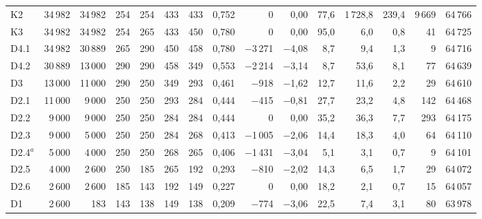\begin{longtable}{lrrrrrrrrrrrrrr}
K2 & 34\,982 & 34\,982 & 254 & 254 & 433 & 433 & 0,752 & 0 & 0,00 & 77,6 & 1\,728,8 & 239,4 & 9\,669 & 64\,766\\
K3 & 34\,982 & 34\,982 & 254 & 265 & 433 & 450 & 0,780 & 0 & 0,00 & 95,0 & 6,0 & 0,8 & 41 & 64\,725\\
D4.1 & 34\,982 & 30\,889 & 265 & 290 & 450 & 458 & 0,780 & $-$3\,271 & $-$4,08 & 8,7 & 9,4 & 1,3 & 9 & 64\,716\\
D4.2 & 30\,889 & 13\,000 & 290 & 290 & 458 & 349 & 0,553 & $-$2\,214 & $-$3,14 & 8,7 & 53,6 & 8,1 & 77 & 64\,639\\
D3 & 13\,000 & 11\,000 & 290 & 250 & 349 & 293 & 0,461 & $-$918 & $-$1,62 & 12,7 & 11,6 & 2,2 & 29 & 64\,610\\
D2.1 & 11\,000 & 9\,000 & 250 & 250 & 293 & 284 & 0,444 & $-$415 & $-$0,81 & 27,7 & 23,2 & 4,8 & 142 & 64\,468\\
D2.2 & 9\,000 & 9\,000 & 250 & 250 & 284 & 284 & 0,444 & 0 & 0,00 & 35,2 & 36,3 & 7,7 & 293 & 64\,175\\
D2.3 & 9\,000 & 5\,000 & 250 & 250 & 284 & 268 & 0,413 & $-$1\,005 & $-$2,06 & 14,4 & 18,3 & 4,0 & 64 & 64\,110\\
D2.4$^{a}$ & 5\,000 & 4\,000 & 250 & 250 & 268 & 265 & 0,406 & $-$1\,431 & $-$3,04 & 5,1 & 3,1 & 0,7 & 9 & 64\,101\\
D2.5 & 4\,000 & 2\,600 & 250 & 185 & 265 & 192 & 0,293 & $-$810 & $-$2,02 & 14,3 & 6,5 & 1,7 & 29 & 64\,072\\
D2.6 & 2\,600 & 2\,600 & 185 & 143 & 192 & 149 & 0,227 & 0 & 0,00 & 18,2 & 2,1 & 0,7 & 15 & 64\,057\\
D1 & 2\,600 & 183 & 143 & 138 & 149 & 138 & 0,209 & $-$774 & $-$3,06 & 22,5 & 7,4 & 3,1 & 80 & 63\,978\\
\end{longtable}
\endgroup
